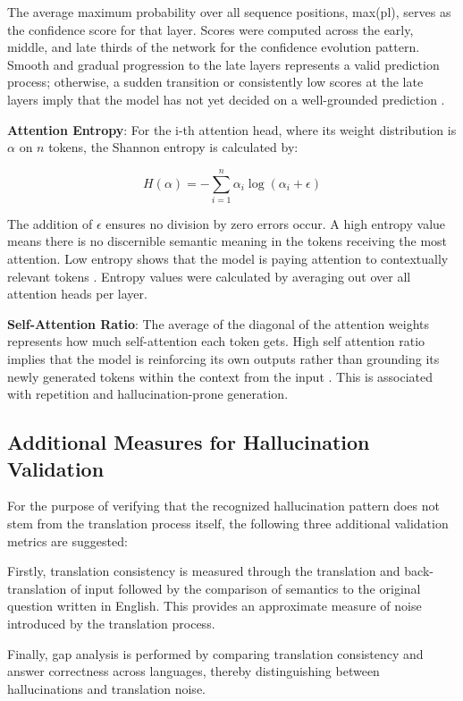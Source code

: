 \documentclass[conference]{IEEEtran}
\begin{document}
The average maximum probability over all sequence positions,
max(pl), serves as the confidence score for that layer. Scores
were computed across the early, middle, and late thirds of the
network for the confidence evolution pattern. Smooth and gradual progression to the late layers represents a valid
prediction process; otherwise, a sudden transition or consistently
low scores at the late layers imply that the model has not yet
decided on a well-grounded prediction \cite{b28}.

\textbf{Attention Entropy}: For the i-th attention head, where its weight distribution
is $\alpha$ on $n$ tokens, the Shannon entropy is calculated by:

\begin{equation}
H(\alpha) = -\sum_{i=1}^{n} \alpha_i \log(\alpha_i + \epsilon)
\end{equation}

The addition of $\epsilon$ ensures no division by zero errors occur.
A high entropy value means there is no discernible semantic meaning in the tokens receiving the most attention. Low entropy shows that the model is paying attention to contextually relevant tokens \cite{b21}.
Entropy values were calculated by averaging out over all attention heads per layer.

\textbf{Self-Attention Ratio}: The average of the diagonal of the
attention weights represents how much self-attention each
token gets. High self attention ratio implies that the model is
reinforcing its own outputs rather than grounding its newly
generated tokens within the context from the input \cite{b29}.
This is associated with repetition and hallucination-prone generation.

\subsection{Additional Measures for Hallucination Validation}

For the purpose of verifying that the recognized hallucination pattern does not stem from the translation process itself, the following three additional validation metrics are suggested:

Firstly, translation consistency is measured through the translation and back-translation of input followed by the comparison of semantics to the original question written in English. This provides an approximate measure of noise introduced by the translation process.

Finally, gap analysis is performed by comparing translation consistency and answer correctness across languages, thereby distinguishing between hallucinations and translation noise.
\end{document}
